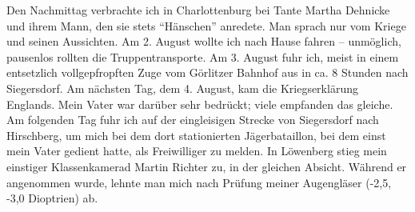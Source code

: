Den Nachmittag verbrachte ich in Charlottenburg bei Tante Martha Dehnicke und ihrem Mann, den sie stets \enquote{Hänschen} anredete. Man sprach nur vom Kriege und seinen Aussichten. Am 2. August wollte ich nach Hause fahren -- unmöglich, pausenlos rollten die Truppentransporte. Am 3. August fuhr ich, meist in einem entsetzlich vollgepfropften Zuge vom Görlitzer Bahnhof aus in ca. 8 Stunden nach Siegersdorf. Am nächsten Tag, dem 4. August, kam die Kriegserklärung Englands. Mein Vater war darüber sehr bedrückt; viele empfanden das gleiche. Am folgenden Tag fuhr ich auf der eingleisigen Strecke von Siegersdorf nach Hirschberg, um mich bei dem dort stationierten Jägerbataillon, bei dem einst mein Vater gedient hatte, als Freiwilliger zu melden. In Löwenberg stieg mein einstiger Klassenkamerad Martin Richter zu, in der gleichen Absicht. Während er angenommen wurde, lehnte man mich nach Prüfung meiner Augengläser (-2,5, -3,0 Dioptrien) ab.

